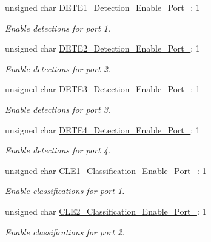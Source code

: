 \begin{DoxyCompactItemize}
\item 
unsigned char \hyperlink{struct_t_p_s238x___detect___classification___enable___register__t_ada3c8b1d5c22dde5c1c73e4d45fd7169}{D\-E\-T\-E1\-\_\-\-Detection\-\_\-\-Enable\-\_\-\-Port\-\_}\-: 1
\begin{DoxyCompactList}\small\item\em Enable detections for port 1. \end{DoxyCompactList}\item 
unsigned char \hyperlink{struct_t_p_s238x___detect___classification___enable___register__t_a79ff41b9318535ab21f6f0d007962a54}{D\-E\-T\-E2\-\_\-\-Detection\-\_\-\-Enable\-\_\-\-Port\-\_}\-: 1
\begin{DoxyCompactList}\small\item\em Enable detections for port 2. \end{DoxyCompactList}\item 
unsigned char \hyperlink{struct_t_p_s238x___detect___classification___enable___register__t_a8261125ffcc2ac69b12038fe26208d27}{D\-E\-T\-E3\-\_\-\-Detection\-\_\-\-Enable\-\_\-\-Port\-\_}\-: 1
\begin{DoxyCompactList}\small\item\em Enable detections for port 3. \end{DoxyCompactList}\item 
unsigned char \hyperlink{struct_t_p_s238x___detect___classification___enable___register__t_afd0cd227bdef1ffe4822c8f74eb32099}{D\-E\-T\-E4\-\_\-\-Detection\-\_\-\-Enable\-\_\-\-Port\-\_}\-: 1
\begin{DoxyCompactList}\small\item\em Enable detections for port 4. \end{DoxyCompactList}\item 
unsigned char \hyperlink{struct_t_p_s238x___detect___classification___enable___register__t_a1515f49bb40c304d2c60d5b2d7cb9997}{C\-L\-E1\-\_\-\-Classification\-\_\-\-Enable\-\_\-\-Port\-\_}\-: 1
\begin{DoxyCompactList}\small\item\em Enable classifications for port 1. \end{DoxyCompactList}\item 
unsigned char \hyperlink{struct_t_p_s238x___detect___classification___enable___register__t_ab8a6cd70cba3506667363b0863afb14c}{C\-L\-E2\-\_\-\-Classification\-\_\-\-Enable\-\_\-\-Port\-\_}\-: 1
\begin{DoxyCompactList}\small\item\em Enable classifications for port 2. \end{DoxyCompactList}\item 

\end{DoxyCompactItemize}

